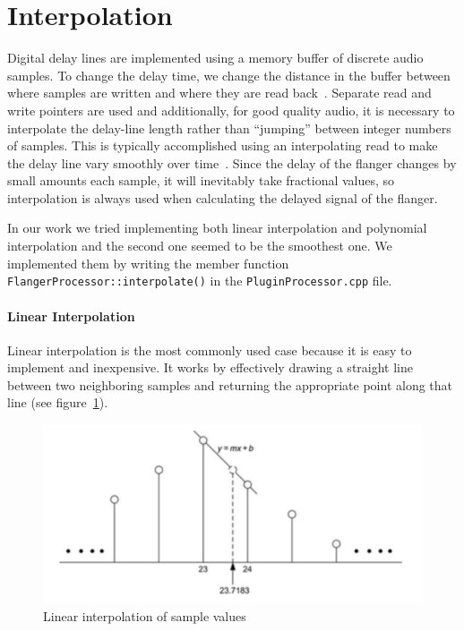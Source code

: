 \section{Interpolation}\label{sec:interpolation}

Digital delay lines are implemented using a memory buffer of discrete audio samples. To change the delay time, we change the distance in the buffer between where samples are written and where they are read back~\cite{reiss2014audio}.
Separate read and write pointers are used and additionally, for good quality audio, it is necessary to interpolate the delay-line length rather than ``jumping'' between integer numbers of samples. This is typically accomplished using an interpolating read to make the delay line vary smoothly over time~\cite{smith2010physical}.
Since the delay of the flanger changes by small amounts each sample, it will inevitably take fractional values, so interpolation is always used when calculating the delayed signal of the flanger.

In our work we tried implementing both linear interpolation and polynomial interpolation and the second one seemed to be the smoothest one.
We implemented them by writing the member function \texttt{FlangerProcessor::interpolate()} in the \texttt{PluginProcessor.cpp} file.

\paragraph{Linear Interpolation}
Linear interpolation is the most commonly used case because it is easy to implement and inexpensive.
It works by effectively drawing a straight line between two neighboring samples and returning the appropriate point along that line (see figure~\ref{fig:linear-interpolation}).
  
\begin{figure}[h]
	\centering
  	\includegraphics[width=0.8\linewidth]{assets/Linear interpolation of sample values.png}
  	\caption{Linear interpolation of sample values}
  	\label{fig:linear-interpolation}
\end{figure}

